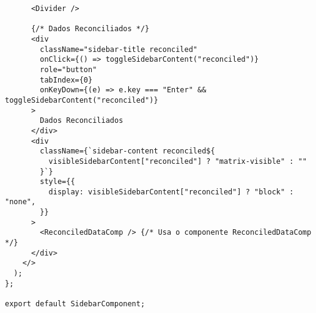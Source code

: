 \begin{verbatim}
      <Divider />

      {/* Dados Reconciliados */}
      <div
        className="sidebar-title reconciled"
        onClick={() => toggleSidebarContent("reconciled")}
        role="button"
        tabIndex={0}
        onKeyDown={(e) => e.key === "Enter" && toggleSidebarContent("reconciled")}
      >
        Dados Reconciliados
      </div>
      <div
        className={`sidebar-content reconciled${
          visibleSidebarContent["reconciled"] ? "matrix-visible" : ""
        }`}
        style={{
          display: visibleSidebarContent["reconciled"] ? "block" : "none",
        }}
      >
        <ReconciledDataComp /> {/* Usa o componente ReconciledDataComp */}
      </div>
    </>
  );
};

export default SidebarComponent;
\end{verbatim}
